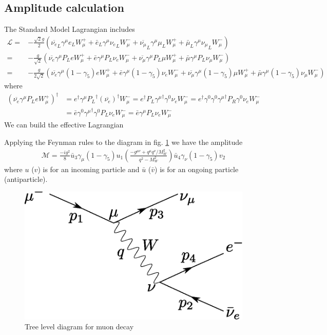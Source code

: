 \subsection{Amplitude calculation}
\label{sec:ampl-calc}
The Standard Model Lagrangian includes
\begin{align}
  \mathcal{L}=&-\frac{\sqrt{2}g}{2}(\overline{\nu_e}_L\gamma^\mu e_L W_\mu^++\bar{e}_L\gamma^\mu{\nu_e}_L W_\mu^-+\overline{\nu_\mu}_L\gamma^\mu\mu_L W_\mu^++\bar{\mu}_L\gamma^\mu{\nu_\mu}_L W_\mu^-)\nonumber\\
=&-\frac{g}{\sqrt{2}}(\overline{\nu_e}\gamma^\mu P_L e W_\mu^++\bar{e}\gamma^\mu P_L{\nu_e} W_\mu^-+\overline{\nu_\mu}\gamma^\mu P_L\mu W_\mu^++\bar{\mu}\gamma^\mu P_L{\nu_\mu} W_\mu^-)\nonumber\\
=&-\frac{g}{2\sqrt{2}}(\overline{\nu_e}\gamma^\mu (1-\gamma_5) e W_\mu^++\bar{e}\gamma^\mu (1-\gamma_5){\nu_e} W_\mu^-+\overline{\nu_\mu}\gamma^\mu (1-\gamma_5)\mu W_\mu^++\bar{\mu}\gamma^\mu (1-\gamma_5){\nu_\mu} W_\mu^-)
\end{align}
where
\begin{align}
  \label{eq:109}
  (\overline{\nu_e}\gamma^\mu P_L e W_\mu^+)^\dagger&=e^\dagger{\gamma^\mu P_L}^\dagger(\overline{\nu_e})^\dagger W_\mu^-
  =e^\dagger P_L{\gamma^\mu}^\dagger\gamma^0\nu_e W_\mu^-=e^\dagger\gamma^0\gamma^0{\gamma^\mu}^\dagger P_R\gamma^0\nu_e W_\mu^-\nonumber\\
  &=\bar{e}\gamma^0{\gamma^\mu}^\dagger\gamma^0P_L\nu_e W_\mu^-=\bar{e}\gamma^\mu P_L\nu_e W_\mu^-
\end{align}
We can build the effective Lagrangian

Applying the Feynman rules to the diagram in fig. 
\ref{fig:1} %
we have the amplitude
\begin{align}
  \mathcal{M}=\frac{-ig^2}{8}\bar{u}_3\gamma_\mu(1-\gamma_5)u_1\left(\frac{-g^{\mu\nu}+q^\mu q^\nu/M_W^2}{q^2-M_W^2}\right)\bar{u}_4\gamma_\nu(1-\gamma_5)v_2
\end{align}
where $u$ ($v$) is for an incoming particle and $\bar{u}$ ($\bar{v}$) is for an ongoing particle (antiparticle).

\begin{figure} %
  \centering %
  \includegraphics{muon_decay}%
  \caption{Tree level diagram for muon decay } %
  \label{fig:1} %
\end{figure} %


